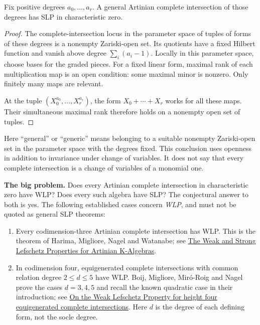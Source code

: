 \begin{lemma}
\label{lemma-generic-complete-intersections}
Fix positive degrees $a_0,\ldots,a_r$.
A general Artinian complete intersection
of those degrees has SLP in
characteristic zero.
\end{lemma}

\begin{proof}
The complete-intersection locus in the
parameter space of tuples of forms of
these degrees is a nonempty Zariski-open
set. Its quotients have a fixed Hilbert
function and vanish above degree
$\sum_i(a_i-1)$.
Locally in this parameter space, choose
bases for the graded pieces.
For a fixed linear form, maximal rank of
each multiplication map is an open
condition: some maximal minor is nonzero.
Only finitely many maps are relevant.

At the tuple $(X_0^{a_0},\ldots,X_r^{a_r})$,
the form $X_0+\cdots+X_r$ works for all
these maps. Their simultaneous maximal
rank therefore holds on a nonempty open
set of tuples.
\end{proof}

Here ``general'' or ``generic'' means
belonging to a suitable nonempty
Zariski-open set in the parameter space
with the degrees fixed.
This conclusion uses openness in addition
to invariance under change of variables.
It does not say that every complete
intersection is a change of variables of
a monomial one.

\medskip\noindent
\textbf{The big problem.}
Does every Artinian complete intersection
in characteristic zero have WLP?
Does every such algebra have SLP?
The conjectural answer to both is yes.
The following established cases concern
\emph{WLP}, and must not be quoted as
general SLP theorems:

\begin{enumerate}
\item Every codimension-three Artinian
complete intersection has WLP.
This is the theorem of Harima, Migliore,
Nagel and Watanabe; see
\href{%
https://arxiv.org/abs/math/0208201%
}{The Weak and Strong Lefschetz
Properties for Artinian K-Algebras}.

\item In codimension four, equigenerated
complete intersections with common
relation degree $2\leq d\leq5$ have WLP.
Boij, Migliore, Miró-Roig and Nagel prove
the cases $d=3,4,5$ and recall the known
quadratic case in their introduction;
see \href{%
https://arxiv.org/abs/2212.09890%
}{On the Weak Lefschetz Property for
height four equigenerated complete
intersections}.
Here $d$ is the degree of each defining
form, not the socle degree.
\end{enumerate}

